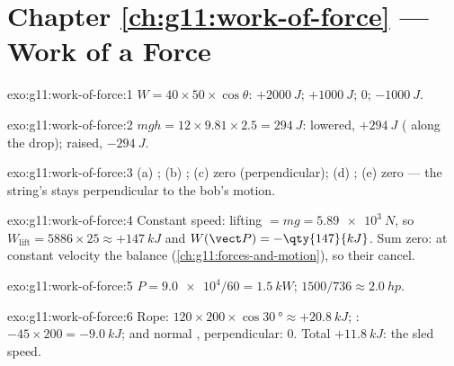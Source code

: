\section*{Chapter \ref{ch:g11:work-of-force} --- Work of a Force}

\begin{solution}{exo:g11:work-of-force:1}
$W = 40 \times 50 \times \cos\theta$: $+\qty{2000}{J}$;
$+\qty{1000}{J}$; $0$; $-\qty{1000}{J}$.
\end{solution}

\begin{solution}{exo:g11:work-of-force:2}
$mgh = 12 \times 9.81 \times 2.5 = \qty{294}{J}$: lowered,
$+\qty{294}{J}$ ( along the drop); raised, $-\qty{294}{J}$.
\end{solution}

\begin{solution}{exo:g11:work-of-force:3}
(a) ; (b) ; (c) zero (perpendicular); (d) ;
(e) zero --- the string's  stays perpendicular to the bob's
motion.
\end{solution}

\begin{solution}{exo:g11:work-of-force:4}
Constant speed: lifting  $= mg = \qty{5.89e3}{N}$, so
$W_{\text{lift}} = 5886 \times 25 \approx +\qty{147}{kJ}$ and
$W(\vect P) = -\qty{147}{kJ}$. Sum zero: at constant velocity the
 balance (\cref{ch:g11:forces-and-motion}), so their 
cancel.
\end{solution}

\begin{solution}{exo:g11:work-of-force:5}
$P = \num{9.0e4}/60 = \qty{1.5}{kW}$; $1500/736 \approx \qty{2.0}{hp}$.
\end{solution}

\begin{solution}{exo:g11:work-of-force:6}
Rope: $120 \times 200 \times \cos\qty{30}{\degree} \approx
+\qty{20.8}{kJ}$; : $-45 \times 200 = -\qty{9.0}{kJ}$; 
and normal , perpendicular: $0$. Total $+\qty{11.8}{kJ}$: the
sled  speed.
\end{solution}

